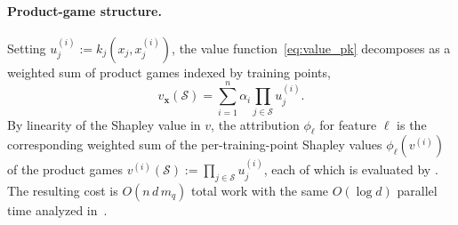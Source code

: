 \documentclass{article}
\newcommand{\cS}{\mathcal{S}}
\newcommand{\E}{\mathbb{E}}
\newcommand{\x}{\mathbf{x}}
\begin{document}
\paragraph{Product-game structure.}
Setting $u^{(i)}_j := k_j(x_j, x^{(i)}_j)$, the value function~\cref{eq:value_pk} decomposes as a weighted sum of product games indexed by training points,
\begin{equation}
\label{eq:value_pk_product_game}
v_{\x}(\cS) = \sum_{i=1}^n \alpha_i \prod_{j\in\cS} u^{(i)}_j.
\end{equation}
By linearity of the Shapley value in $v$, the attribution $\phi_\ell$ for feature $\ell$ is the corresponding weighted sum of the per-training-point Shapley values $\phi_\ell(v^{(i)})$ of the product games $v^{(i)}(\cS):=\prod_{j\in\cS}u^{(i)}_j$, each of which is evaluated by . The resulting cost is $O(n\,d\,m_q)$ total work with the same $O(\log d)$ parallel time analyzed in~.



\end{document}
